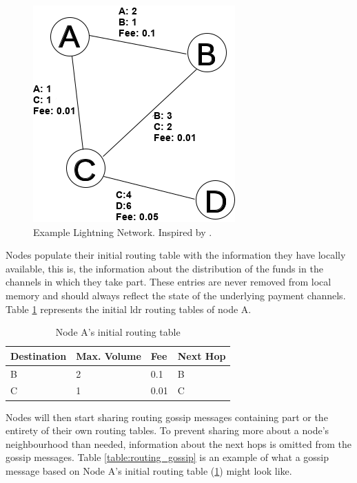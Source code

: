 \begin{figure}[H]
\begin{center}
  \includegraphics[width=0.6\linewidth]{images/networkabcd_cap.png}
  \caption{Example Lightning Network. Inspired by \cite{distance_vector}.}
  \label{fig:networkabcd}
  \end{center}
\end{figure}

Nodes populate their initial routing table with the information they have locally available, this is, the information about the distribution of the funds in the channels in which they take part. These entries are never removed from local memory and should always reflect the state of the underlying payment channels. Table \ref{table:routing_table_initial_a} represents the initial \acrshort{ldr} routing tables of node A.

\begin{table}[H]
\centering
\begin{tabular}{|l|l|l|l|}
\hline
\rowcolor[HTML]{C0C0C0} 
Destination & Max. Volume   & Fee   & Next Hop \\ \hline
B           & 2             & 0.1   & B       \\ \hline
C           & 1             & 0.01  & C       \\ \hline
\end{tabular}
\caption{Node A's initial routing table}
\label{table:routing_table_initial_a}
\end{table}

Nodes will then start sharing routing gossip messages containing part or the entirety of their own routing tables. To prevent sharing more about a node's neighbourhood than needed, information about the next hops is omitted from the gossip messages. Table \ref{table:routing_gossip} is an example of what a gossip message based on Node A's initial routing table (\ref{table:routing_table_initial_a}) might look like.


